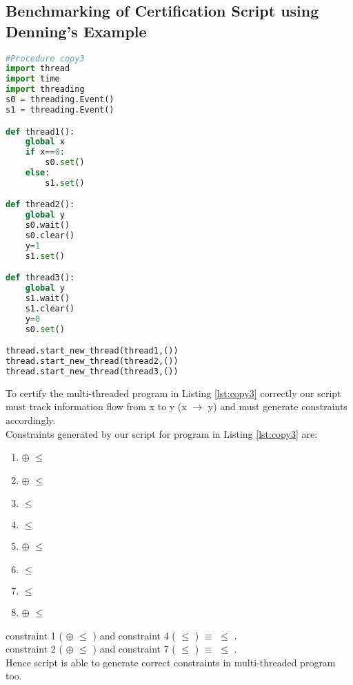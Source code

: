 \subsection{Benchmarking of Certification Script using Denning's Example \cite{denning}}
\begin{lstlisting}[language=Python, caption=Python version of copy3 example in \cite{denning}. goal: information flow from x to y, label={lst:copy3} ]
#Procedure copy3
import thread
import time
import threading
s0 = threading.Event()
s1 = threading.Event()

def thread1():
	global x
	if x==0:
		s0.set()
	else:
		s1.set()

def thread2():
	global y
	s0.wait()
	s0.clear()
	y=1
	s1.set()

def thread3():
	global y
	s1.wait()
	s1.clear()
	y=0
	s0.set()

thread.start_new_thread(thread1,())
thread.start_new_thread(thread2,())
thread.start_new_thread(thread3,())
\end{lstlisting}

To certify the multi-threaded program in Listing \ref{lst:copy3} correctly our script must track information flow from x to y (x $\rightarrow$ y) and must generate constraints accordingly.\\
Constraints generated by our script for program in Listing \ref{lst:copy3} are:
\begin{enumerate}
	\item {} $\oplus$  $\leqslant$  
	\item{} $\oplus$  $\leqslant$  
	\item{} $\leqslant$ 
	\item{} $\leqslant$ 
	\item{} $\oplus$  $\leqslant$  
	\item{} $\leqslant$ 
	\item{} $\leqslant$ 
	\item{} $\oplus$  $\leqslant$  
\end{enumerate}  
constraint 1 ( $\oplus$  $\leqslant$  ) and constraint 4 ( $\leqslant$ ) \hspace{1cm} $\equiv$ \hspace{1cm}  $\leqslant$ .\\
constraint 2 (  $\oplus$     $\leqslant$  ) and constraint 7 (  $\leqslant$ ) \hspace{1cm} $\equiv$ \hspace{1cm} 
 $\leqslant$ .\\	
Hence script is able to generate correct constraints in multi-threaded program too.
      
